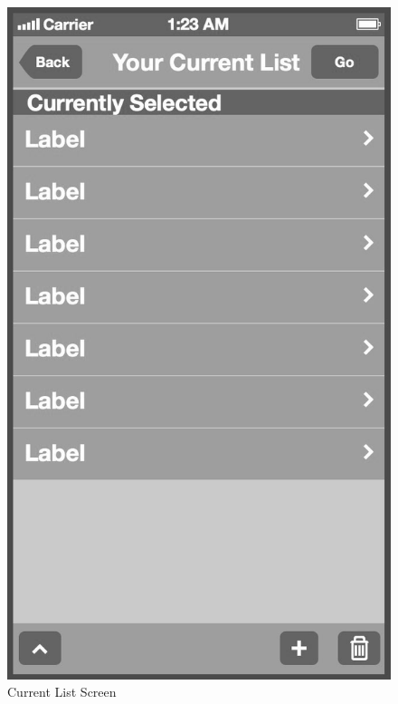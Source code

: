 \\
\begin{figure}[!tb]
    \begin{minipage}[b]{0.45\linewidth}
        \centering
        \includegraphics[width=0.8025\linewidth]{figures/Screen_2_bw.jpg}
        \caption[Current List Screen]{Current List Screen}
        \label{fig:CurrentListScreen}
    \end{minipage}
    \hspace{0.5cm}
    \begin{minipage}[b]{0.45\linewidth}
        \centering

\end{minipage}
\end{figure}
